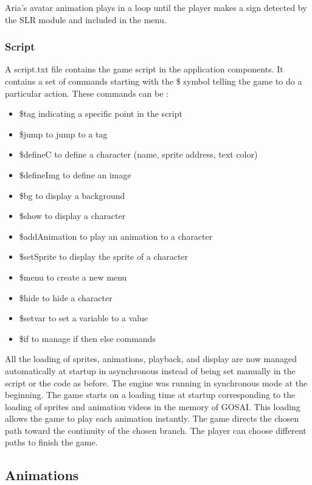 Aria's avatar animation plays in a loop until the player makes a sign detected by the SLR module and included in the menu. 

\subsubsection{Script}

A script.txt file contains the game script in the application components. It contains a set of commands starting with the \$ symbol telling the game to do a particular action. These commands can be :
\begin{itemize}
    \item \$tag indicating a specific point in the script
    \item \$jump to jump to a tag
    \item \$defineC to define a character (name, sprite address, text color)
    \item \$defineImg to define an image
    \item \$bg to display a background
    \item \$show to display a character
    \item \$addAnimation to play an animation to a character
    \item \$setSprite to display the sprite of a character
    \item \$menu to create a new menu
    \item \$hide to hide a character
    \item \$setvar to set a variable to a value
    \item \$if to manage if then else commands
\end{itemize}

All the loading of sprites, animations, playback, and display are now managed automatically at startup in asynchronous instead of being set manually in the script or the code as before. The engine was running in synchronous mode at the beginning. The game starts on a loading time at startup corresponding to the loading of sprites and animation videos in the memory of GOSAI. This loading allows the game to play each animation instantly. The game directs the chosen path toward the continuity of the chosen branch. The player can choose different paths to finish the game.

\subsection{Animations}

